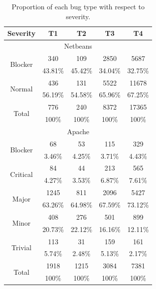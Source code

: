 \begin{table}[h!]
\centering
\begin{tabular}{c|c|c|c|c}
Severity                  & T1      & T2      & T3      & T4      \\
\hline \hline
\multicolumn{5}{c}{Netbeans}                                      \\ \hline
\multirow{2}{*}{Blocker}  & 340     & 109     & 2850    & 5687    \\
                          & 43.81\% & 45.42\% & 34.04\% & 32.75\% \\ \hline
\multirow{2}{*}{Normal}   & 436     & 131     & 5522    & 11678   \\
                          & 56.19\% & 54.58\% & 65.96\% & 67.25\% \\
                          \hline
\multirow{2}{*}{Total}    & 776     & 240     & 8372    & 17365   \\
                          & 100\%   & 100\%   & 100\%   & 100\%   \\
\hline \hline
\multicolumn{5}{c}{Apache}                                        \\ \hline
\multirow{2}{*}{Blocker}  & 68      & 53      & 115     & 329     \\
                          & 3.46\%  & 4.25\%  & 3.71\%  & 4.43\%  \\
                          \hline
\multirow{2}{*}{Critical} & 84      & 44      & 213     & 565     \\
                          & 4.27\%  & 3.53\%  & 6.87\%  & 7.61\%  \\
                          \hline
\multirow{2}{*}{Major}    & 1245    & 811     & 2096    & 5427    \\
                          & 63.26\% & 64.98\% & 67.59\% & 73.12\% \\
                          \hline
\multirow{2}{*}{Minor}    & 408     & 276     & 501     & 899     \\
                          & 20.73\% & 22.12\% & 16.16\% & 12.11\% \\
                          \hline
\multirow{2}{*}{Trivial}  & 113     & 31      & 159     & 161     \\
                          & 5.74\%  & 2.48\%  & 5.13\%  & 2.17\%  \\
                          \hline
\multirow{2}{*}{Total}    & 1918    & 1215    & 3084    & 7381    \\
                          & 100\%   & 100\%   & 100\%   & 100\%  \\
\hline \hline
\end{tabular}
\caption{Proportion of each bug type with respect to severity.}
\label{tab:bug-taxo-rq2-severity}
\end{table}

